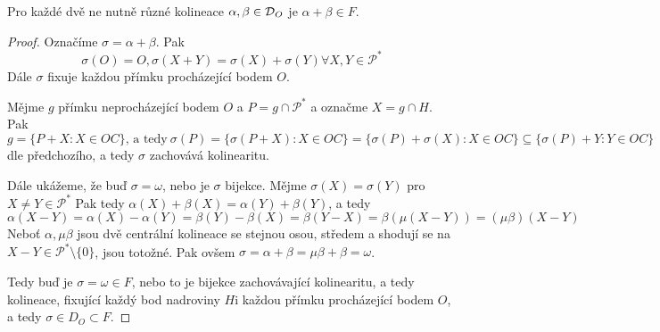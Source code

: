 \begin{lemma}
    Pro každé dvě ne nutně různé kolineace $\alpha,\beta\in \operatorname{\mathcal{D}}_O$ je $\alpha+\beta\in F$.
\end{lemma}
\begin{proof}
    Označíme $\sigma = \alpha+\beta$.
    Pak
    \[ \sigma(O) = O, \sigma(X+Y) = \sigma(X)+\sigma(Y)\forall X,Y\in\mathcal P^* \]
    Dále $\sigma$ fixuje každou přímku procházející bodem $O$.

    Mějme $g$ přímku neprocházející bodem $O$ a $P=g\cap \mathcal{P}^*$ a označme $X=g\cap H$.
    Pak
    \[ g=\{P+X: X\in OC\}\text{, a tedy}\ \sigma(P)=\{\sigma(P+X): X\in OC\}=\{\sigma(P)+\sigma(X): X\in OC\}\subseteq \{\sigma(P)+Y: Y\in OC\} \]
    dle předchozího, a tedy $\sigma$ zachovává kolinearitu.

    Dále ukážeme, že buď $\sigma=\omega$, nebo je $\sigma$ bijekce.
    Mějme $\sigma(X)=\sigma(Y)$ pro $X\neq Y\in\mathcal P^*$
    Pak tedy $\alpha(X)+\beta(X) = \alpha(Y)+\beta(Y)$, a tedy
    \[\alpha(X-Y) = \alpha(X)-\alpha(Y) = \beta(Y)-\beta(X) = \beta(Y-X)=\beta(\mu(X-Y)) = (\mu\beta)(X-Y) \]
    Neboť $\alpha, \mu\beta$ jsou dvě centrální kolineace se stejnou osou, středem a shodují se na $X-Y\in\mathcal P^*\setminus\{0\}$, jsou totožné.
    Pak ovšem $\sigma = \alpha+\beta = \mu\beta+\beta = \omega$.

    Tedy buď je $\sigma=\omega\in F$, nebo to je bijekce zachovávající kolinearitu, a tedy kolineace, fixující každý bod nadroviny $H$i každou přímku procházející bodem $O$, a tedy $\sigma\in D_O\subset F$.
\end{proof}

